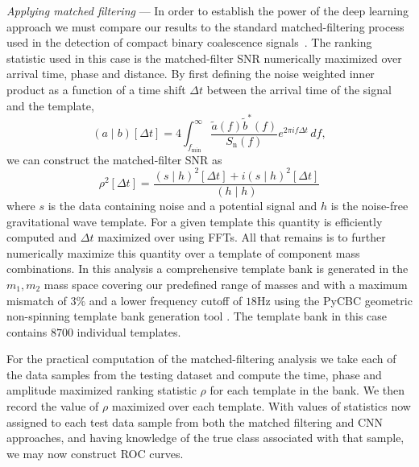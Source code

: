 \documentclass[%
showpacs,
 amsmath,amssymb,
 aps,
 twocolumn,
 prl,
 reprint,
floatfix,
]{revtex4-1}
\newcommand{\cnnsnreight}{97.88}
\begin{document}
%
%
\textit{Applying matched filtering} ---
%
%
In order to establish the power of the deep learning approach we must compare
our results to the standard matched-filtering process used in the detection of
compact binary coalescence
signals~\cite{PhysRevD.85.122006,2013PhRvD..87b4033B}. The ranking statistic
used in this case is the matched-filter \ac{SNR} numerically maximized over
arrival time, phase and distance. By first defining the noise weighted inner
product as a function of a time shift $\Delta t$ between the arrival time of
the signal and the template,
%
%
\begin{equation}
(a\mid b)[\Delta t] =
4\int_{f_{\mathrm{min}}}^{\infty}\frac{\tilde{a}(f)\tilde{b}^{*}(f)}{S_{\mathrm{n}}(f)}e^{2\pi i
f\Delta t}\,df,
\end{equation}
%
we can construct the matched-filter \ac{SNR} as 
%
\begin{equation}
\rho^{2}[\Delta t]=\frac{(s\mid h)^{2}[\Delta t] + i(s\mid h)^{2}[\Delta t]}{(h\mid h)}
\end{equation}
%
where $s$ is the data containing noise and a potential signal and $h$ is the
noise-free gravitational wave template. For a given template this quantity is
efficiently computed and $\Delta t$ maximized over using \acp{FFT}.  All that
remains is to further numerically maximize this quantity over a template of
component mass combinations. In this analysis a comprehensive template bank is
generated in the $m_{1},m_{2}$ mass space covering our predefined range of
masses and with a maximum mismatch of $3\%$ and a lower frequency cutoff of $18\mathrm{Hz}$ using the PyCBC geometric non-spinning template bank generation tool \cite{pycbc-software,0264-9381-33-21-215004} 
. The template bank in this case contains $8700$ individual templates. 

%
%
For the practical computation of the matched-filtering analysis we take each of
the data samples from the testing dataset and compute the time, phase and
amplitude maximized ranking statistic $\rho$ for each template in the bank. We
then record the value of $\rho$ maximized over each template. With values of
statistics now assigned to each test data sample from both the
matched filtering and \ac{CNN} approaches, and having knowledge of the
true class associated with that sample, we may now construct \ac{ROC} curves.  

%
%
%
%
\end{document}
